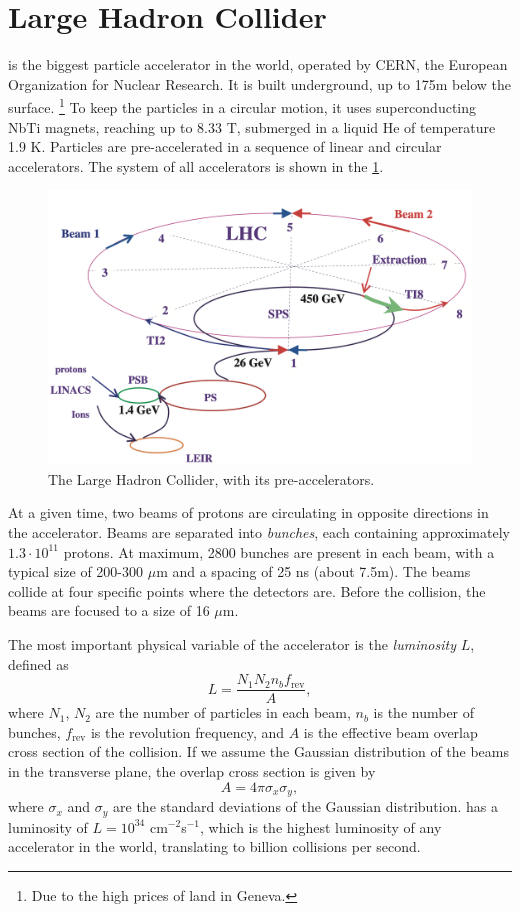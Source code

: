 \section{Large Hadron Collider}
\label{sec:lhc}
\LHC is the biggest particle accelerator in the world, operated by CERN, the European Organization for Nuclear Research.
It is built underground, up to 175m below the surface. \footnote{Due to the high prices of land in Geneva.}
To keep the particles in a circular motion, it uses superconducting NbTi magnets, reaching up to 8.33 T, submerged in a liquid He of temperature 1.9 K.
Particles are pre-accelerated in a sequence of linear and circular accelerators.
The system of all accelerators is shown in the \cref{fig:lhc}.
\begin{figure}[htb]
    \centering
    \includegraphics[width=0.9\linewidth]{src/img/LHC.png}
    \caption{The Large Hadron Collider, with its pre-accelerators.}
    \label{fig:lhc}
\end{figure}


At a given time, two beams of protons are circulating in opposite directions in the accelerator.
Beams are separated into \emph{bunches}, each containing approximately $1.3\cdot10^{11}$ protons.
At maximum, 2800 bunches are present in each beam, with a typical size of 200-300 $\mu$m and a spacing of 25 ns (about 7.5m).
The beams collide at four specific points where the detectors are.
Before the collision, the beams are focused to a size of 16 $\mu$m.

The most important physical variable of the accelerator is the \emph{luminosity} $L$, defined as 
\begin{equation}
    \label{eq:lumni}
    L = \frac{N_1 N_2 n_b f_{\text{rev}}}{A}, 
\end{equation}
where $N_1$, $N_2$ are the number of particles in each beam, $n_b$ is the number of bunches, $f_{\text{rev}}$ is the revolution frequency, and $A$ is the effective beam overlap cross section of the collision. 
If we assume the Gaussian distribution of the beams in the transverse plane, the overlap cross section is given by 
\begin{equation}
    A = 4 \pi \sigma_x \sigma_y,
\end{equation}
where $\sigma_x$ and $\sigma_y$ are the standard deviations of the Gaussian distribution.
\LHC has a luminosity of $L = 10^{34}$ cm$^{-2}$s$^{-1}$, which is the highest luminosity of any accelerator in the world, translating to billion collisions per second.


